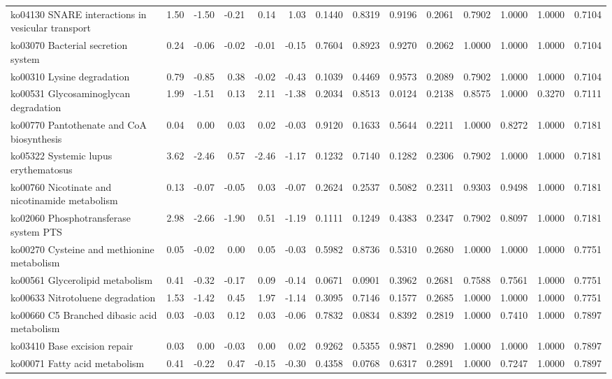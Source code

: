 {\begin{landscape}
\begin{longtable}{ | l | r | r | r | r | r | r  | r | r | r | r | r | r  | r  |}
			ko04130  SNARE interactions in vesicular transport & 1.50 & -1.50 & -0.21 & 0.14 & 1.03 & 0.1440 & 0.8319 & 0.9196 & 0.2061 & 0.7902 & 1.0000 & 1.0000 & 0.7104 \\ 
			ko03070  Bacterial secretion system & 0.24 & -0.06 & -0.02 & -0.01 & -0.15 & 0.7604 & 0.8923 & 0.9270 & 0.2062 & 1.0000 & 1.0000 & 1.0000 & 0.7104 \\ 
			ko00310  Lysine degradation & 0.79 & -0.85 & 0.38 & -0.02 & -0.43 & 0.1039 & 0.4469 & 0.9573 & 0.2089 & 0.7902 & 1.0000 & 1.0000 & 0.7104 \\ 
			ko00531  Glycosaminoglycan degradation & 1.99 & -1.51 & 0.13 & 2.11 & -1.38 & 0.2034 & 0.8513 & 0.0124 & 0.2138 & 0.8575 & 1.0000 & 0.3270 & 0.7111 \\ 
			ko00770  Pantothenate and CoA biosynthesis & 0.04 & 0.00 & 0.03 & 0.02 & -0.03 & 0.9120 & 0.1633 & 0.5644 & 0.2211 & 1.0000 & 0.8272 & 1.0000 & 0.7181 \\ 
			ko05322  Systemic lupus erythematosus & 3.62 & -2.46 & 0.57 & -2.46 & -1.17 & 0.1232 & 0.7140 & 0.1282 & 0.2306 & 0.7902 & 1.0000 & 1.0000 & 0.7181 \\ 
			ko00760  Nicotinate and nicotinamide metabolism & 0.13 & -0.07 & -0.05 & 0.03 & -0.07 & 0.2624 & 0.2537 & 0.5082 & 0.2311 & 0.9303 & 0.9498 & 1.0000 & 0.7181 \\ 
			ko02060  Phosphotransferase system PTS  & 2.98 & -2.66 & -1.90 & 0.51 & -1.19 & 0.1111 & 0.1249 & 0.4383 & 0.2347 & 0.7902 & 0.8097 & 1.0000 & 0.7181 \\ 
			ko00270  Cysteine and methionine metabolism & 0.05 & -0.02 & 0.00 & 0.05 & -0.03 & 0.5982 & 0.8736 & 0.5310 & 0.2680 & 1.0000 & 1.0000 & 1.0000 & 0.7751 \\ 
			ko00561  Glycerolipid metabolism & 0.41 & -0.32 & -0.17 & 0.09 & -0.14 & 0.0671 & 0.0901 & 0.3962 & 0.2681 & 0.7588 & 0.7561 & 1.0000 & 0.7751 \\ 
			ko00633  Nitrotoluene degradation & 1.53 & -1.42 & 0.45 & 1.97 & -1.14 & 0.3095 & 0.7146 & 0.1577 & 0.2685 & 1.0000 & 1.0000 & 1.0000 & 0.7751 \\ 
			ko00660  C5 Branched dibasic acid metabolism & 0.03 & -0.03 & 0.12 & 0.03 & -0.06 & 0.7832 & 0.0834 & 0.8392 & 0.2819 & 1.0000 & 0.7410 & 1.0000 & 0.7897 \\ 
			ko03410  Base excision repair & 0.03 & 0.00 & -0.03 & 0.00 & 0.02 & 0.9262 & 0.5355 & 0.9871 & 0.2890 & 1.0000 & 1.0000 & 1.0000 & 0.7897 \\ 
			ko00071  Fatty acid metabolism & 0.41 & -0.22 & 0.47 & -0.15 & -0.30 & 0.4358 & 0.0768 & 0.6317 & 0.2891 & 1.0000 & 0.7247 & 1.0000 & 0.7897 \\ 

\end{longtable}
\end{landscape}}
